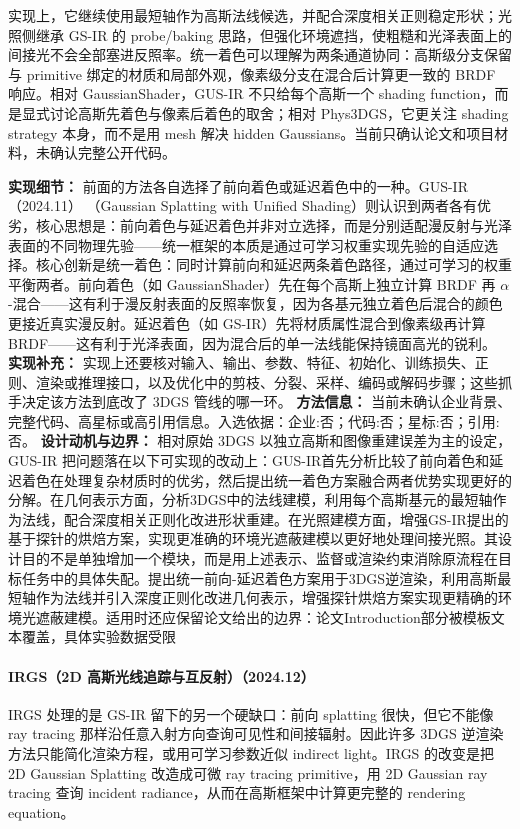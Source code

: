 实现上，它继续使用最短轴作为高斯法线候选，并配合深度相关正则稳定形状；光照侧继承 GS-IR 的 probe/baking 思路，但强化环境遮挡，使粗糙和光泽表面上的间接光不会全部塞进反照率。统一着色可以理解为两条通道协同：高斯级分支保留与 primitive 绑定的材质和局部外观，像素级分支在混合后计算更一致的 BRDF 响应。相对 GaussianShader，GUS-IR 不只给每个高斯一个 shading function，而是显式讨论高斯先着色与像素后着色的取舍；相对 Phys3DGS，它更关注 shading strategy 本身，而不是用 mesh 解决 hidden Gaussians。当前只确认论文和项目材料，未确认完整公开代码。

\textbf{实现细节：} 前面的方法各自选择了前向着色或延迟着色中的一种。GUS-IR（2024.11） （Gaussian Splatting with Unified Shading）则认识到两者各有优劣，核心思想是：前向着色与延迟着色并非对立选择，而是分别适配漫反射与光泽表面的不同物理先验——统一框架的本质是通过可学习权重实现先验的自适应选择。核心创新是统一着色：同时计算前向和延迟两条着色路径，通过可学习的权重平衡两者。前向着色（如 GaussianShader）先在每个高斯上独立计算 BRDF 再 $\alpha$-混合——这有利于漫反射表面的反照率恢复，因为各基元独立着色后混合的颜色更接近真实漫反射。延迟着色（如 GS-IR）先将材质属性混合到像素级再计算 BRDF——这有利于光泽表面，因为混合后的单一法线能保持镜面高光的锐利。
\textbf{实现补充：} 实现上还要核对输入、输出、参数、特征、初始化、训练损失、正则、渲染或推理接口，以及优化中的剪枝、分裂、采样、编码或解码步骤；这些抓手决定该方法到底改了 3DGS 管线的哪一环。
\textbf{方法信息：} 当前未确认企业背景、完整代码、高星标或高引用信息。入选依据：企业:否；代码:否；星标:否；引用:否。
\textbf{设计动机与边界：} 相对原始 3DGS 以独立高斯和图像重建误差为主的设定，GUS-IR 把问题落在以下可实现的改动上：GUS-IR首先分析比较了前向着色和延迟着色在处理复杂材质时的优劣，然后提出统一着色方案融合两者优势实现更好的分解。在几何表示方面，分析3DGS中的法线建模，利用每个高斯基元的最短轴作为法线，配合深度相关正则化改进形状重建。在光照建模方面，增强GS-IR提出的基于探针的烘焙方案，实现更准确的环境光遮蔽建模以更好地处理间接光照。其设计目的不是单独增加一个模块，而是用上述表示、监督或渲染约束消除原流程在目标任务中的具体失配。提出统一前向-延迟着色方案用于3DGS逆渲染，利用高斯最短轴作为法线并引入深度正则化改进几何表示，增强探针烘焙方案实现更精确的环境光遮蔽建模。适用时还应保留论文给出的边界：论文Introduction部分被模板文本覆盖，具体实验数据受限
\paragraph{IRGS（2D 高斯光线追踪与互反射）（2024.12）\cite{2412_15867}}
IRGS 处理的是 GS-IR 留下的另一个硬缺口：前向 splatting 很快，但它不能像 ray tracing 那样沿任意入射方向查询可见性和间接辐射。因此许多 3DGS 逆渲染方法只能简化渲染方程，或用可学习参数近似 indirect light。IRGS 的改变是把 2D Gaussian Splatting 改造成可微 ray tracing primitive，用 2D Gaussian ray tracing 查询 incident radiance，从而在高斯框架中计算更完整的 rendering equation。

